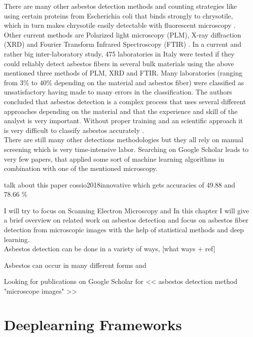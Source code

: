 There are many other asbestos detection methods and counting strategies like using certain proteins from Escherichia coli that binds strongly to chrysotile, which in turn makes chrysotile easily detectable with fluorescent microscopy \cite{kuroda2008detection}. Other current methods are Polarized light microscopy (PLM), X-ray diffraction (XRD) and Fourier Transform Infrared Spectroscopy (FTIR) \cite{campopiano2018inter}. In a current and rather big inter-laboratory study, 475 laboratories in Italy were tested if they could reliably detect asbestos fibers in several bulk materials using the above mentioned three methods of PLM, XRD and FTIR. Many laboratories (ranging from 3\% to 40\% depending on the material and asbestos fiber) were classified as unsatisfactory having made to many errors in the classification. The authors concluded that asbestos detection is a complex process that uses several different approaches depending on the material and that the  experience and skill of the analyst is very important. Without proper training and an scientific approach it is very difficult to classify asbestos accurately \cite{campopiano2018inter}. \\

There are still many other detections methodologies but they all rely on manual screening which is very time-intensive labor. Searching on Google Scholar leads to very few papers, that applied some sort of machine learning algorithms in combination with one of the mentioned microscopy.

talk about this paper cossio2018innovative which gets accuracies of 49.88 and 78.66 \%

I will try to focus on Scanning Electron Microscopy and 
In this chapter I will give a brief overview on related work on asbestos detection and focus on asbestos fiber detection from microscopic images with the help of statistical methods and deep learning. \\




Asbestos detection can be done in a variety of ways, [what ways + ref]

Asbestos can occur in many different forms and 

Looking for publications on Google Scholar for << asbestos detection method "microscope images" >>

\section{Deeplearning Frameworks}

